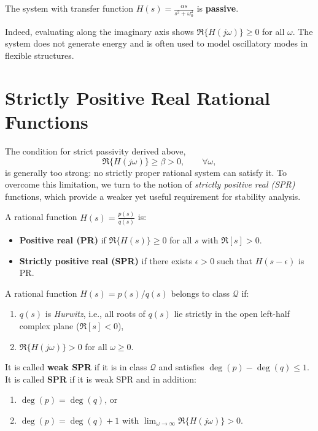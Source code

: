 \begin{theorem}\label{thm:oscillatory_passivity}
The system with transfer function $H(s) = \tfrac{\alpha s}{s^2 + \omega_0^2}$ is 
\textbf{passive}.
\end{theorem}

\begin{remark}
Indeed, evaluating along the imaginary axis shows $\Re\{H(j\omega)\} \ge 0$ for all 
$\omega$. The system does not generate energy and is often used to model oscillatory 
modes in flexible structures.  
\end{remark}

\section{Strictly Positive Real Rational Functions}

The condition for strict passivity derived above,
\begin{equation}
\Re\{H(j\omega)\} \ge \beta > 0, \qquad \forall \omega,
\end{equation}
is generally too strong: no strictly proper rational system can satisfy it.  
To overcome this limitation, we turn to the notion of 
\emph{strictly positive real (SPR)} functions, which provide a weaker yet useful 
requirement for stability analysis.  

\begin{definition}
A rational function $H(s) = \tfrac{p(s)}{q(s)}$ is:
\begin{itemize}
    \item \textbf{Positive real (PR)} if $\Re\{H(s)\} \ge 0$ for all $s$ with $\Re[s] > 0$.
    \item \textbf{Strictly positive real (SPR)} if there exists $\epsilon > 0$ such that 
    $H(s-\epsilon)$ is PR.
\end{itemize}
\end{definition}

\begin{definition}
A rational function $H(s) = p(s)/q(s)$ belongs to class $\mathcal{Q}$ if:
\begin{enumerate}
    \item $q(s)$ is \emph{Hurwitz}, i.e., all roots of $q(s)$ lie strictly in the open 
    left-half complex plane ($\Re[s] < 0$),
    \item $\Re\{H(j\omega)\} > 0$ for all $\omega \ge 0$.
\end{enumerate}
It is called \textbf{weak SPR} if it is in class $\mathcal{Q}$ and satisfies
$\deg(p) - \deg(q) \le 1$.  
It is called \textbf{SPR} if it is weak SPR and in addition:
\begin{enumerate}
    \item $\deg(p) = \deg(q)$, or
    \item $\deg(p) = \deg(q)+1$ with $\lim_{\omega\to\infty} \Re\{H(j\omega)\} > 0$.
\end{enumerate}
\end{definition}

